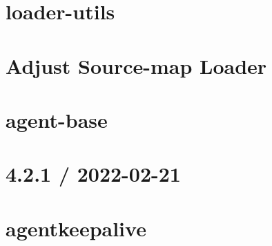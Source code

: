 \documentclass[twoside]{book}
\newcommand{\+}{\discretionary{\mbox{\scriptsize$\hookleftarrow$}}{}{}}
\begin{document}
\chapter{loader-\/utils}
\label{md__c___users_vaishnavi_jadhav__desktop__developer_code_mean_stack_example_client_node_modules_ae0a6722b1583af145d95225794fada54}

\chapter{Adjust Source-\/map Loader}
\label{md__c___users_vaishnavi_jadhav__desktop__developer_code_mean_stack_example_client_node_modules_adjust_sourcemap_loader_readme}

\chapter{agent-\/base}
\label{md__c___users_vaishnavi_jadhav__desktop__developer_code_mean_stack_example_client_node_modules_agent_base__r_e_a_d_m_e}

\chapter{4.2.1 / 2022-\/02-\/21}
\label{md__c___users_vaishnavi_jadhav__desktop__developer_code_mean_stack_example_client_node_modules_agentkeepalive__history}

\chapter{agentkeepalive}
\label{md__c___users_vaishnavi_jadhav__desktop__developer_code_mean_stack_example_client_node_modules_agentkeepalive__r_e_a_d_m_e}

\end{document}
